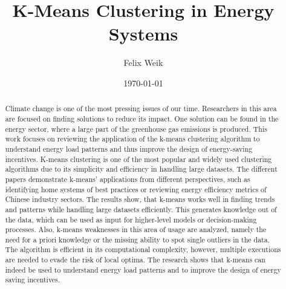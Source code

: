 \documentclass{revtex4-2}
\begin{document}
\title{K-Means Clustering in Energy Systems}
\author{Felix Weik}
\date{\today}


\begin{abstract}
Climate change is one of the most pressing issues of our time. 
Researchers in this area are focused on finding solutions to reduce its impact.
One solution can be found in the energy sector, where a large part of the greenhouse gas emissions is produced.
This work focuses on reviewing the application of the k-means clustering algorithm to understand energy load patterns and thus improve the design of energy-saving incentives.
K-means clustering is one of the most popular and widely used clustering algorithms due to its simplicity and efficiency in handling large datasets.
The different papers demonstrate k-means' applications from different perspectives, such as identifying home systems of best practices or reviewing energy efficiency metrics of Chinese industry sectors.
The results show, that k-means works well in finding trends and patterns while handling large datasets efficiently.
This generates knowledge out of the data, which can be used as input for higher-level models or decision-making processes.
Also, k-means weaknesses in this area of usage are analyzed, namely the need for a priori knowledge or the missing ability to spot single outliers in the data.
The algorithm is efficient in its computational complexity, however, multiple executions are needed to evade the risk of local optima.
The research shows that k-means can indeed be used to understand energy load patterns and to improve the design of energy saving incentives.
\end{abstract}

\maketitle











\end{document}
